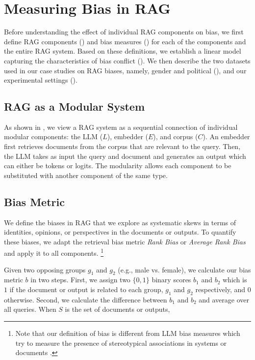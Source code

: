 \section{Measuring Bias in RAG}
\label{sec:measure}
Before understanding the effect of individual RAG components on bias, we first define RAG components () and bias measures () for each of the components and the entire RAG system. Based on these definitions, we establish a linear model capturing the characteristics of bias conflict (). We then describe the two datasets used in our case studies on RAG biases, namely, gender and political (), and our experimental settings ().

\subsection{RAG as a Modular System}
\label{sec:rag-system}

As shown in , we view a RAG system as a sequential connection of individual modular components: the LLM ($L$), embedder ($E$), and corpus ($C$). An embedder first retrieves documents from the corpus that are relevant to the query. Then, the LLM takes as input the query and document and generates an output which can either be tokens or logits. The modularity allows each component to be substituted with another component of the same type. 

\subsection{Bias Metric}\label{sec:bias-metric}
We define the biases in RAG that we explore as systematic skews in terms of identities, opinions, or perspectives in the documents or outputs. To quantify these biases, we adapt the retrieval bias metric \emph{Rank Bias} or \emph{Average Rank Bias} \citep{rekabsaz2020neural,kulshrestha2017quantifying} and apply it to all components. \footnote{Note that our definition of bias is different from LLM bias measures which try to measure the presence of stereotypical associations in systems or documents \citep{parrish2021bbq,nangia2020crows,nadeem2020stereoset}.} 

Given two opposing groups $g_1$ and $g_2$ (e.g., male vs. female), we calculate our bias metric $b$ in two steps. First, we assign two $\{0,1\}$ binary scores $b_1$ and $b_2$ which is $1$ if the document or output is related to each group, $g_1$ and $g_2$ respectively, and $0$ otherwise. Second, we calculate the difference between $b_1$ and $b_2$ and average over all queries. When $S$ is the set of documents or outputs,

